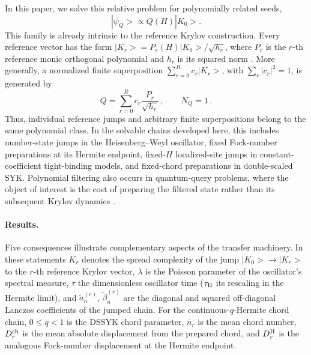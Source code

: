 \documentclass[a4paper,11pt]{article}
\def\ket#1{|#1>}%
\theoremstyle{definition}
\theoremstyle{remark}
\newcommand{\ket}[1]{|#1\rangle}
\begin{document}
In this paper, we solve this relative problem for polynomially related seeds,
\begin{equation}
   \ket{\psi_Q}\propto Q(H)\ket{K_0}.
   \label{eq:intro-seed}
\end{equation}
This family is already intrinsic to the reference Krylov construction. Every reference vector has the form
$\ket{K_r}=P_r(H)\ket{K_0}/\sqrt{h_r}$, where $P_r$ is the $r$-th reference monic orthogonal polynomial and $h_r$ is its squared norm \cite{MuckYang:2022}. More generally, a normalized finite superposition
$\sum_{r=0}^{R}c_r\ket{K_r}$, with $\sum_r|c_r|^2=1$, is generated by
\begin{equation}
   Q=\sum_{r=0}^{R}c_r\frac{P_r}{\sqrt{h_r}}\,,
   \qquad N_Q=1\,.
\end{equation}
Thus, individual reference jumps and arbitrary finite superpositions belong to the same polynomial class. In the solvable chains developed here, this includes number-state jumps in the Heisenberg--Weyl oscillator, fixed Fock-number preparations at its Hermite endpoint, fixed-$H$ localized-site jumps in constant-coefficient tight-binding models, and fixed-chord preparations in double-scaled SYK. Polynomial filtering also occurs in quantum-query problems, where the object of interest is the cost of preparing the filtered state rather than its subsequent Krylov dynamics \cite{Adhikari2026Query}.

\paragraph{Results.}
Five consequences illustrate complementary aspects of the transfer machinery. In these statements $K_r$ denotes the
spread complexity of the jump $\ket{K_0}\to\ket{K_r}$ to the $r$-th reference Krylov vector,
$\lambda$ is the Poisson parameter of the oscillator's spectral measure, $\tau$ the dimensionless
oscillator time ($\tau_{\rm H}$ its rescaling in the Hermite limit), and $\widetilde a_n^{(r)}$,
$\widetilde\beta_n^{(r)}$ are the diagonal and squared off-diagonal Lanczos coefficients of the
jumped chain.  For the continuous-$q$-Hermite chord
chain, $0\le q<1$ is the DSSYK chord parameter, $\overline n_r$ is the mean chord number,
$D_r^{\rm ch}$ is the mean absolute displacement from the prepared chord, and $D_r^{\rm H}$ is
the analogous Fock-number displacement at the Hermite endpoint.
\end{document}
